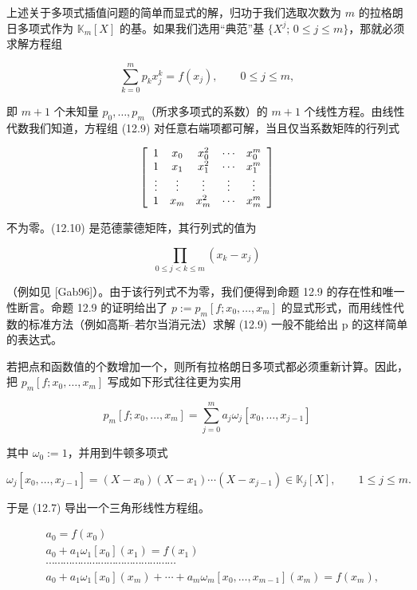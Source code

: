 \begin{remark}

\begin{items}
\item

上述关于多项式插值问题的简单而显式的解，归功于我们选取次数为  $ m $ 的拉格朗日多项式作为  $ \mathbb{K}_m[X] $ 的基。如果我们选用“典范”基  $ \{X^j;\, 0 \leq j \leq m\} $，那就必须求解方程组

\begin{equation}
\sum_{k=0}^{m}p_{k}x_{j}^{k}=f(x_{j}),\qquad0\leq j\leq m,
\end{equation}

即 $m+1$ 个未知量 $p_{0},\ldots,p_{m}$（所求多项式的系数）的 $m+1$ 个线性方程。由线性代数我们知道，方程组 (12.9) 对任意右端项都可解，当且仅当系数矩阵的行列式

\begin{equation}
\left[\begin{array}{c c c c c}1&x_{0}&x_{0}^{2}&\cdots&x_{0}^{m}\\ 1&x_{1}&x_{1}^{2}&\cdots&x_{1}^{m}\\ \vdots&\vdots&\vdots&\vdots&\vdots\\ 1&x_{m}&x_{m}^{2}&\cdots&x_{m}^{m}\end{array}\right]
\end{equation}

不为零。(12.10) 是范德蒙德矩阵，其行列式的值为

\[
\prod_{0\leq j<k\leq m}(x_{k}-x_{j})
\]

（例如见 [Gab96]）。由于该行列式不为零，我们便得到命题 12.9 的存在性和唯一性断言。命题 12.9 的证明给出了  $ p:=p_m[f;x_0,\ldots,x_m] $ 的显式形式，而用线性代数的标准方法（例如高斯–若尔当消元法）求解 (12.9) 一般不能给出 p 的这样简单的表达式。

\item

若把点和函数值的个数增加一个，则所有拉格朗日多项式都必须重新计算。因此，把  $ p_m[f; x_0, \ldots, x_m] $ 写成如下形式往往更为实用

\[
p_{m}[f;x_{0},\ldots,x_{m}]=\sum_{j=0}^{m}a_{j}\omega_{j}[x_{0},\ldots,x_{j-1}]
\]

其中  $ \omega_{0} := 1 $，并用到牛顿多项式

\[
\omega_{j}[x_{0},\ldots,x_{j-1}]=(X-x_{0})(X-x_{1})\cdots(X-x_{j-1})\in\mathbb{K}_{j}[X],\qquad1\leq j\leq m.
\]

于是 (12.7) 导出一个三角形线性方程组。

\begin{equation*}
\begin{aligned}
&a_{0}=f(x_{0})\\ &a_{0}+a_{1}\omega_{1}[x_{0}](x_{1})=f(x_{1})\\ &\cdots\cdots\cdots\cdots\cdots\cdots\cdots\cdots\cdots\cdots\cdots\cdots\cdots\cdots\cdots\\ &a_{0}+a_{1}\omega_{1}[x_{0}](x_{m})+\cdots+a_{m}\omega_{m}[x_{0},\ldots,x_{m-1}](x_{m})=f(x_{m})\text{,}\\
\end{aligned}
\end{equation*}


\end{items}
\end{remark}
